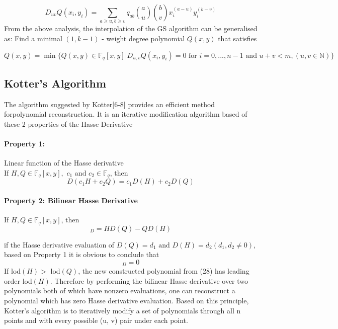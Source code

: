 \documentclass[fontsize=12pt]{article}
\begin{document}
\begin{equation}
D_{uv}Q{(x_i,y_i)} =\sum_{a \geq u,b \geq v} q_{ab}\binom{a}{u} \binom{b}{v} x_i^{(a-u)}y_i^{(b-v)}
\label{18}
\end{equation}
From the above analysis, the interpolation of the GS algorithm can be
generalised as: Find a minimal $(1, k-1)$ - weight degree
polynomial $Q(x, y)$ that satisfies

\begin{equation}
Q(x,y) = \min\{Q(x,y) \in \mathbb{F}_q[x,y]  | D_{u,v}Q(x_i,y_i) = 0 \text{ for } i = 0,...,n-1 \text{ and } u+v < m, (u,v \in \mathbb{N}) \}
\label{19}
\end{equation}

\subsection{Kotter's Algorithm}
The algorithm suggested by Kotter[6-8] provides an efficient method forpolynomial reconstruction. It is an iterative modification algorithm based of these 2 properties of the Hasse Derivative
\paragraph{Property 1: } Linear function of the Hasse derivative\\ If $H,Q \in \mathbb{F}_q[x,y],  \,\, c_1\text{ and } c_2 \in \mathbb{F}_q$, then
\begin{equation}
D(c_1H + c_2Q) = c_1D(H) + c_2D(Q)
\end{equation}

\paragraph{Property 2: Bilinear Hasse Derivative} If $H,Q \in \mathbb{F}_q[x,y]$,  then
\begin{equation}[H,Q]_D = HD(Q) - QD(H)\label{21}\end{equation}

if the Hasse derivative evaluation of $D(Q) =d_1 \text{ and } D(H) =d_2 (d_1,d_2 \neq 0)$, based on Property 1 it is obvious to conclude that 
\begin{equation}[H,Q]_D =0 \label{22}\end{equation}
If lod$(H) >$ lod$(Q)$, the new constructed polynomial from
(28) has leading order lod$(H)$. Therefore by performing
the bilinear Hasse derivative over two polynomials both
of which have nonzero evaluations, one can reconstruct a
polynomial which has zero Hasse derivative evaluation.
Based on this principle, Kotter’s algorithm is to iteratively
modify a set of polynomials through all n points and with
every possible (u, v) pair under each point.
\end{document}
